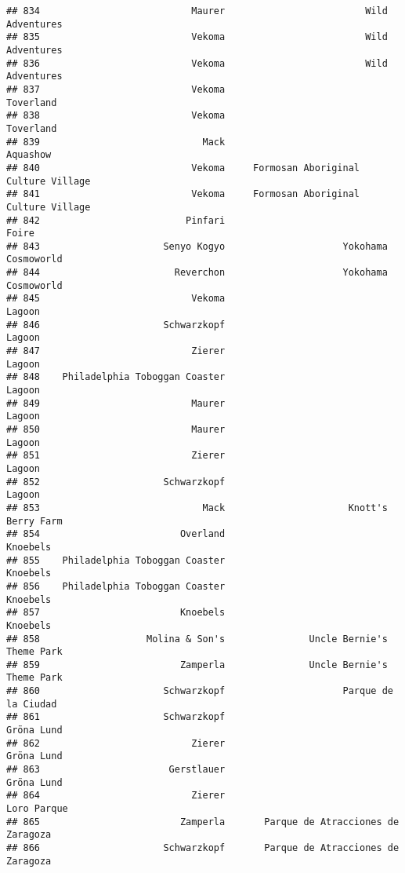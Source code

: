 \documentclass[
]{article}
\begin{document}
\begin{verbatim}
## 834                           Maurer                         Wild Adventures
## 835                           Vekoma                         Wild Adventures
## 836                           Vekoma                         Wild Adventures
## 837                           Vekoma                               Toverland
## 838                           Vekoma                               Toverland
## 839                             Mack                                Aquashow
## 840                           Vekoma     Formosan Aboriginal Culture Village
## 841                           Vekoma     Formosan Aboriginal Culture Village
## 842                          Pinfari                                   Foire
## 843                      Senyo Kogyo                     Yokohama Cosmoworld
## 844                        Reverchon                     Yokohama Cosmoworld
## 845                           Vekoma                                  Lagoon
## 846                      Schwarzkopf                                  Lagoon
## 847                           Zierer                                  Lagoon
## 848    Philadelphia Toboggan Coaster                                  Lagoon
## 849                           Maurer                                  Lagoon
## 850                           Maurer                                  Lagoon
## 851                           Zierer                                  Lagoon
## 852                      Schwarzkopf                                  Lagoon
## 853                             Mack                      Knott's Berry Farm
## 854                         Overland                                Knoebels
## 855    Philadelphia Toboggan Coaster                                Knoebels
## 856    Philadelphia Toboggan Coaster                                Knoebels
## 857                         Knoebels                                Knoebels
## 858                   Molina & Son's               Uncle Bernie's Theme Park
## 859                         Zamperla               Uncle Bernie's Theme Park
## 860                      Schwarzkopf                     Parque de la Ciudad
## 861                      Schwarzkopf                              Gröna Lund
## 862                           Zierer                              Gröna Lund
## 863                       Gerstlauer                              Gröna Lund
## 864                           Zierer                             Loro Parque
## 865                         Zamperla       Parque de Atracciones de Zaragoza
## 866                      Schwarzkopf       Parque de Atracciones de Zaragoza

\end{verbatim}
\end{document}

